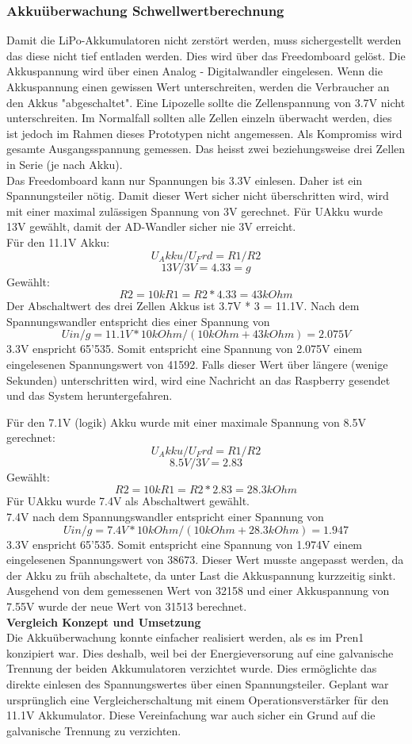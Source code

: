\subsubsection{Akkuüberwachung Schwellwertberechnung}
Damit die LiPo-Akkumulatoren nicht zerstört werden, muss sichergestellt werden das diese nicht tief entladen werden. Dies wird über das Freedomboard gelöst. Die Akkuspannung wird über einen Analog - Digitalwandler eingelesen. Wenn die Akkuspannung einen gewissen Wert unterschreiten, werden die Verbraucher an den Akkus "abgeschaltet". Eine Lipozelle sollte die Zellenspannung von 3.7V nicht unterschreiten. Im Normalfall sollten alle Zellen einzeln überwacht werden, dies ist jedoch im Rahmen dieses Prototypen nicht angemessen. Als Kompromiss wird gesamte Ausgangsspannung gemessen. Das heisst zwei beziehungsweise drei Zellen in Serie (je nach Akku).\\
Das Freedomboard kann nur Spannungen bis 3.3V einlesen. Daher ist ein Spannungsteiler nötig. Damit dieser Wert sicher nicht überschritten wird, wird mit einer maximal zulässigen Spannung von 3V gerechnet. Für UAkku wurde 13V gewählt, damit der AD-Wandler sicher nie 3V erreicht.\\
Für den 11.1V Akku:
\[	U_Akku/U_Frd=R1/R2\]
\[	13V/3V=4.33=g\]
Gewählt:
\[	R2=10k R1=R2*4.33=43kOhm\]
Der Abschaltwert des drei Zellen Akkus ist 3.7V * 3 = 11.1V.
Nach dem Spannungswandler entspricht dies einer Spannung von \[Uin/g=11.1V*10kOhm/(10kOhm+43kOhm)=2.075V\]
3.3V enspricht 65'535. Somit entspricht eine Spannung von 2.075V einem eingelesenen Spannungswert von 41592. Falls dieser Wert über längere (wenige Sekunden) unterschritten wird, wird eine Nachricht an das Raspberry gesendet und das System heruntergefahren.

Für den 7.1V (logik) Akku wurde mit einer maximale Spannung von 8.5V gerechnet:
\[	U_Akku/U_Frd=R1/R2\]
\[	8.5V/3V=2.83\]
Gewählt:
\[	R2=10k R1=R2*2.83=28.3kOhm\]
Für UAkku wurde 7.4V als Abschaltwert gewählt.\\
7.4V nach dem Spannungswandler entspricht einer Spannung von \[Uin/g=7.4V*10kOhm/(10kOhm + 28.3kOhm)=1.947\]
3.3V enspricht 65'535. Somit entspricht eine Spannung von 1.974V einem eingelesenen Spannungswert von 38673. Dieser Wert musste angepasst werden, da der Akku zu früh abschaltete, da unter Last die Akkuspannung kurzzeitig sinkt. Ausgehend von dem gemessenen Wert von 32158 und einer Akkuspannung von 7.55V wurde der neue Wert von 31513 berechnet.
\\[0.2cm]
\textbf{Vergleich Konzept und Umsetzung}\\[0.2cm]
Die Akkuüberwachung konnte einfacher realisiert werden, als es im Pren1 konzipiert war. Dies deshalb, weil bei der Energieversorung auf eine galvanische Trennung der beiden Akkumulatoren verzichtet wurde. Dies ermöglichte das direkte einlesen des Spannungswertes über einen Spannungsteiler. Geplant war ursprünglich eine Vergleicherschaltung mit einem Operationsverstärker für den 11.1V Akkumulator. Diese Vereinfachung war auch sicher ein Grund auf die galvanische Trennung zu verzichten.
